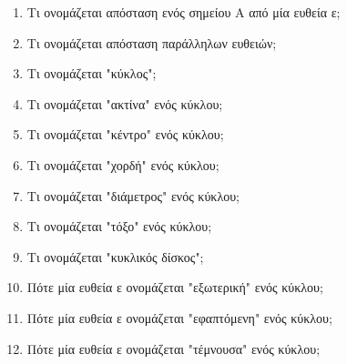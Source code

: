 \documentclass[a4paper,11pt]{report}
\begin{document}
\begin{enumerate}
\item Τι ονομάζεται απόσταση ενός σημείου Α από μία ευθεία ε;
\item Τι ονομάζεται απόσταση παράλληλων ευθειών;
\item Τι ονομάζεται "κύκλος";
\item Τι ονομάζεται "ακτίνα" ενός κύκλου;
\item Τι ονομάζεται "κέντρο" ενός κύκλου;
\item Τι ονομάζεται "χορδή" ενός κύκλου;
\item Τι ονομάζεται "διάμετρος" ενός κύκλου;
\item Τι ονομάζεται "τόξο" ενός κύκλου;
\item Τι ονομάζεται "κυκλικός δίσκος";
\item Πότε μία ευθεία ε ονομάζεται "εξωτερική" ενός κύκλου;
\item Πότε μία ευθεία ε ονομάζεται "εφαπτόμενη" ενός κύκλου;
\item Πότε μία ευθεία ε ονομάζεται "τέμνουσα" ενός κύκλου;
\end{enumerate}
\end{document}
